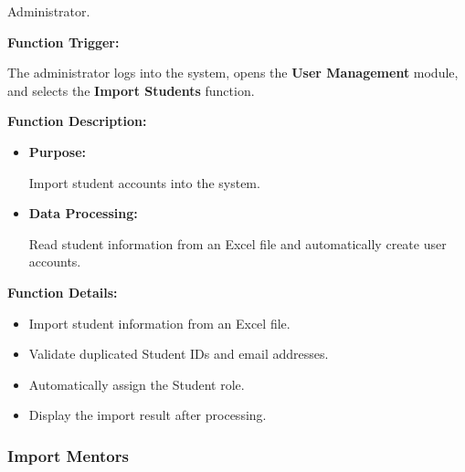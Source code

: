 Administrator.

\vspace{0.3cm}

\textbf{Function Trigger:}

The administrator logs into the system, opens the \textbf{User Management} module, and selects the \textbf{Import Students} function.

\vspace{0.3cm}

\textbf{Function Description:}

\begin{itemize}
    \item \textbf{Purpose:}

    Import student accounts into the system.

    \item \textbf{Data Processing:}

    Read student information from an Excel file and automatically create user accounts.
\end{itemize}

\vspace{0.3cm}

\textbf{Function Details:}

\begin{itemize}
    \item Import student information from an Excel file.

    \item Validate duplicated Student IDs and email addresses.

    \item Automatically assign the Student role.

    \item Display the import result after processing.
\end{itemize}


\subsubsection{Import Mentors}

